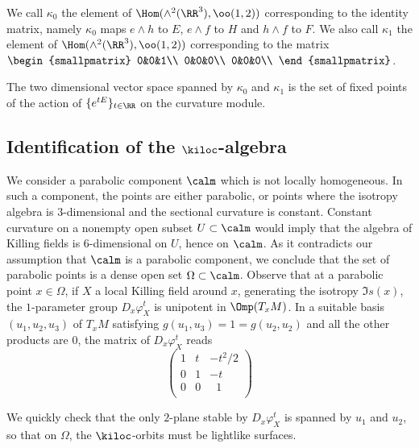 We call $\kappa_0$ the element of $\Hom(\wedge^2(\RR^3),\oo(1,2))$ corresponding to the identity matrix, namely $\kappa_0$ maps $e \wedge h$ to $E$, $e \wedge f$ to $H$ and $h \wedge f$ to $F$. We also call $\kappa_1$ the element of $\Hom(\wedge^2(\RR^3),\oo(1,2))$ corresponding to the matrix $\begin{smallpmatrix} 0&0&1\\ 0&0&0\\ 0&0&0\\
\end{smallpmatrix} $.

The two dimensional vector space spanned by $\kappa_0$ and $\kappa_1$ is the set of fixed points of the action of $\{ e^{tE} \}_{t \in \RR}$ on the curvature module.

\subsection{Identification of the \texorpdfstring{$\kiloc$}{kiloc}-algebra}
We consider a parabolic component $\calm$ which is not locally homogeneous. In such a component, the points are either parabolic, or points where the isotropy algebra is $3$-dimensional and the sectional curvature is constant. Constant curvature on a nonempty open subset $U \subset \calm$ would imply that the algebra of Killing fields is $6$-dimensional on $U$, hence on $\calm$. As it contradicts our assumption that $\calm$ is a parabolic component, we conclude that the set of parabolic points is a dense open set $\Omega \subset \calm$. Observe that at a parabolic point $x \in \Omega$, if $X$ a local Killing field around $x$, generating the isotropy ${\mathfrak Is}(x)$, the $1$-parameter group $D_x\varphi_X^t$ is unipotent in $\Omp(T_xM)$. In a suitable basis $(u_1,u_2,u_3)$ of $T_xM$ satisfying $g(u_1,u_3)=1=g(u_2,u_2)$ and all the other products are $0$, the matrix of $D_x\varphi_X^t$ reads
\[
\begin{pmatrix}
1&t&-t^2/2\\
0&1&-t\\
0&0&\;\;1\\
\end{pmatrix}
\]

We quickly check that the only $2$-plane stable by $D_x\varphi_X^t$ is spanned by $u_1$ and $u_2$, so that on $\Omega$, the $\kiloc$-orbits must be lightlike surfaces.


